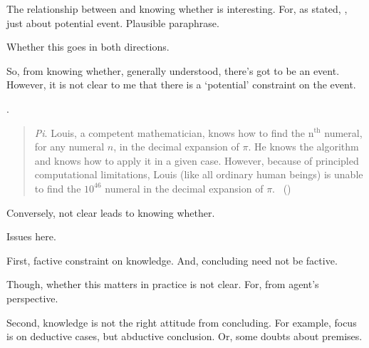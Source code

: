 \begin{note}
  The relationship between  and knowing whether is interesting.
  For, as stated, , just about potential event.
  Plausible paraphrase.

  Whether this goes in both directions.

  So, from knowing whether, generally understood, there's got to be an event.
  However, it is not clear to me that there is a `potential' constraint on the event.

  \cite{Bengson:2011th}.
  \begin{quote}
    \emph{Pi}.
    Louis, a competent mathematician, knows how to find the n\(^{\text{th}}\) numeral, for any numeral \(n\), in the decimal expansion of \(\pi\).
    He knows the algorithm and knows how to apply it in a given case.
    However, because of principled computational limitations, Louis (like all ordinary human beings) is unable to find the \(10^{46}\) numeral in the decimal expansion of \(\pi\).%
    \mbox{ }\hfill\mbox{(\citeyear[170]{Bengson:2011th})}
  \end{quote}

  Conversely, not clear  leads to knowing whether.

  Issues here.

  First, factive constraint on knowledge.
  And, concluding need not be factive.

  Though, whether this matters in practice is not clear.
  For, from agent's perspective.

  Second, knowledge is not the right attitude from concluding.
  For example, focus is on deductive cases, but abductive conclusion.
  Or, some doubts about premises.
\end{note}

